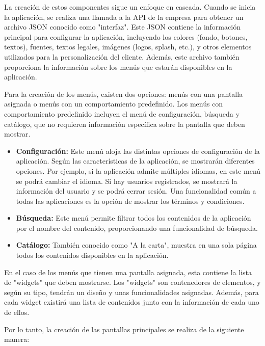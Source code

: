 La creación de estos componentes sigue un enfoque en cascada. Cuando se inicia la aplicación, se realiza una llamada a la API de la empresa para obtener 
un archivo JSON conocido como "interfaz". Este JSON contiene la información principal para configurar la aplicación, incluyendo los colores (fondo, botones, 
textos), fuentes, textos legales, imágenes (logos, splash, etc.), y otros elementos utilizados para la personalización del cliente. Además, este archivo 
también proporciona la información sobre los menús que estarán disponibles en la aplicación.

Para la creación de los menús, existen dos opciones: menús con una pantalla asignada o menús con un comportamiento predefinido. Los menús con comportamiento 
predefinido incluyen el menú de configuración, búsqueda y catálogo, que no requieren información específica sobre la pantalla que deben mostrar.

\begin{itemize}
    \item \textbf{Configuración:} Este menú aloja las distintas opciones de configuración de la aplicación. Según las características de la aplicación, 
    se mostrarán diferentes opciones. Por ejemplo, si la aplicación admite múltiples idiomas, en este menú se podrá cambiar el idioma. Si hay usuarios 
    registrados, se mostrará la información del usuario y se podrá cerrar sesión. Una funcionalidad común a todas las aplicaciones es la opción de mostrar 
    los términos y condiciones.
    
    \item \textbf{Búsqueda:} Este menú permite filtrar todos los contenidos de la aplicación por el nombre del contenido, proporcionando una funcionalidad de búsqueda.
    
    \item \textbf{Catálogo:} También conocido como "A la carta", muestra en una sola página todos los contenidos disponibles en la aplicación.
\end{itemize}

En el caso de los menús que tienen una pantalla asignada, esta contiene la lista de "widgets" que deben mostrarse. Los "widgets" son contenedores de 
elementos, y según su tipo, tendrán un diseño y unas funcionalidades asignadas. Además, para cada widget existirá una lista de contenidos junto con 
la información de cada uno de ellos. 

Por lo tanto, la creación de las pantallas principales se realiza de la siguiente manera:

